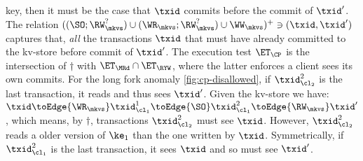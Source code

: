 key, then it {must} be
the case that $\txid$ commits before the commit of $\txid'$.
The relation $((\SO ; \RW_{\mkvs}^{?}) \cup (\WR_{\mkvs} ; \RW_{\mkvs}^{?}) \cup \WW_\mkvs )^{+} \ni (\txid, \txid')$
captures that, {\em all} the transactions $\txid$ that {must} have already committed to the kv-store before commit of \( \txid' \).
The execution test $\ET_{\CP}$ is the intersection of $\dagger$ with $\ET_\MRd \cap \ET_\RYW$,
where the latter enforces a client sees its own commits.
For the long fork anomaly \cref{fig:cp-disallowed},
if \( \txid_{\cl_2}^2\) is the last transaction, it reads and thus sees \( \txid' \).
Given the kv-store we have:
\(
\txid \toEdge{\WR_\mkvs} \txid^1_{\cl_1} \toEdge{\SO} \txid^2_{\cl_1} \toEdge{\RW_\mkvs} \txid'
\),
which means, by \( \dagger \), transactions \( \txid_{\cl_2}^2 \) must see \( \txid \).
However, \(  \txid_{\cl_2}^2 \) reads a older version of \( \ke_1 \) than the one written by \( \txid \).
Symmetrically,
if \( \txid_{\cl_1}^2\) is the last transaction, it sees \( \txid \) and so must see \( \txid' \).

